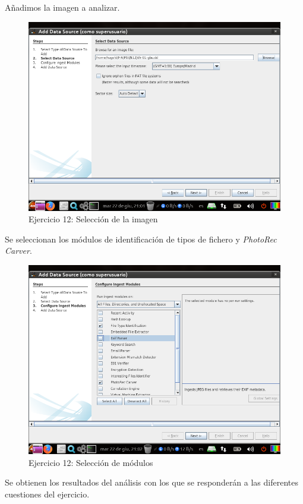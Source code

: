 \documentclass[11pt]{article}
\begin{document}
Añadimos la imagen a analizar.

\begin{figure}[H]
    \caption{Ejercicio 12: Selección de la imagen}
    \centering
    \includegraphics[scale=0.7]{e12-3.png}
\end{figure}

Se seleccionan los módulos de identificación de tipos de fichero y \textit{PhotoRec Carver}.

\begin{figure}[H]
    \caption{Ejercicio 12: Selección de módulos}
    \centering
    \includegraphics[scale=0.7]{e12-4.png}
\end{figure}

Se obtienen los resultados del análisis con los que se responderán a las diferentes cuestiones del ejercicio.
\end{document}
